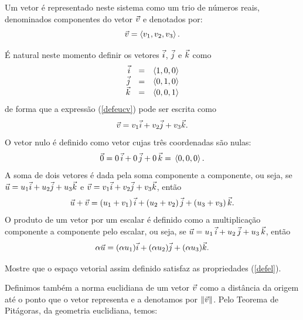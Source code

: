  Um vetor é representado neste sistema como um trio de números reais, denominados componentes do vetor $\vec{v}$ e denotados por: 
\begin{equation}\label{defeucv}\vec{v}=\left<v_1,v_2,v_3\right>.\end{equation}
  
É natural neste momento definir os vetores $\vec{i}$, $\vec{j}$ e $\vec{k}$ como
\begin{equation}\label{defijk}
\begin{array}{rcl}
\vec{i}&=&\left<1,0,0\right>\\
\vec{j}&=&\left<0,1,0\right>\\
\vec{k}&=&\left<0,0,1\right>
\end{array}
\end{equation}
de forma que a expressão (\ref{defeucv}) pode ser escrita como
\begin{equation}\label{repijk}\vec{v}=v_1  \vec{i}+v_2  \vec{j}+v_3 \vec{k}.\end{equation}
O vetor nulo é definido como vetor cujas três coordenadas são nulas:
\begin{equation}\label{defnulo}\vec{0}=0 ~\! \vec{i}+0~\!  \vec{j}+0~\!  \vec{k}= ~\!\left<0,0,0\right>.\end{equation}
A soma de dois vetores é dada pela soma componente a componente, ou seja, se $\vec{u}=u_1  \vec{i}+u_2\vec{j}+u_3 \vec{k}$ e $\vec{v}=v_1\vec{i}+v_2\vec{j}+v_3 \vec{k}$, então
\begin{equation}\label{defsoma}\vec{u}+\vec{v}= \left(u_1+v_1\right) \vec{i}+\left(u_2+v_2\right) \vec{j}+\left(u_3+v_3\right) \vec{k}.\end{equation}
O produto de um vetor por um escalar é definido como a multiplicação componente a componente pelo escalar, ou seja, se $\vec{u}=u_1~\!  \vec{i}+u_2~\!  \vec{j}+u_3 ~\! \vec{k}$, então
\begin{equation}\label{defprod}\alpha\vec{u}=(\alpha u_1)\vec{i}+(\alpha u_2)\vec{j}+(\alpha u_3) \vec{k} .\end{equation}

\begin{prob} Mostre que o espaço vetorial assim definido satisfaz as propriedades (\ref{defel}).
\end{prob}

Definimos também a norma euclidiana de um vetor $\vec{v}$ como a distância da origem até o ponto que o vetor representa e a denotamos por $\|\vec{v}\|$. Pelo Teorema de Pitágoras, da geometria euclidiana, temos:


